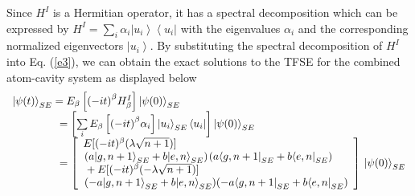\documentclass[
showpacs,  %
showkeys,  %
aps,       %
amsthm,    %
amsmath,   %
amsfonts,  %
amssymb    %
]{revtex4-1}          %
\begin{document}
Since ${H^I}$ is a Hermitian operator, it has a spectral decomposition which can be expressed by ${H^I} = \sum\limits_i {{\alpha _i}} \left| {{u_i}} \right\rangle \left\langle {{u_i}} \right|$ with the eigenvalues ${{\alpha _i}}$ and the corresponding normalized eigenvectors $\left| {{u_i}} \right\rangle$. By substituting the spectral decomposition of ${H^I}$ into Eq. (\ref{e3}), we can obtain the exact solutions to the TFSE for the combined atom-cavity system as displayed below
\begin{eqnarray}
\label{e12}
\begin{array}{l}
{\left| {\psi (t)} \right\rangle _{SE}} = {E_\beta }\left[ {{{( - it)}^\beta }H_\beta ^I} \right]{\left| {\psi (0)} \right\rangle _{SE}}\\
{\kern 1pt} {\kern 1pt} {\kern 1pt} {\kern 1pt} {\kern 1pt} {\kern 1pt} {\kern 1pt} {\kern 1pt} {\kern 1pt} {\kern 1pt} {\kern 1pt} {\kern 1pt} {\kern 1pt} {\kern 1pt} {\kern 1pt} {\kern 1pt} {\kern 1pt} {\kern 1pt} {\kern 1pt} {\kern 1pt} {\kern 1pt} {\kern 1pt} {\kern 1pt} {\kern 1pt} {\kern 1pt} {\kern 1pt} {\kern 1pt} {\kern 1pt} {\kern 1pt} {\kern 1pt} {\kern 1pt} {\kern 1pt} {\kern 1pt} {\kern 1pt} {\kern 1pt} {\kern 1pt} {\kern 1pt} {\kern 1pt} {\kern 1pt} {\kern 1pt} {\kern 1pt}  = \left[ {\sum\limits_i {{E_\beta }\left[ {{{( - it)}^\beta }{\alpha _i}} \right]{{\left| {{u_i}} \right\rangle }_{SE}}\left\langle {{u_i}} \right|} } \right]{\left| {\psi (0)} \right\rangle _{SE}}\\
{\kern 1pt} {\kern 1pt} {\kern 1pt} {\kern 1pt} {\kern 1pt} {\kern 1pt} {\kern 1pt} {\kern 1pt} {\kern 1pt} {\kern 1pt} {\kern 1pt} {\kern 1pt} {\kern 1pt} {\kern 1pt} {\kern 1pt} {\kern 1pt} {\kern 1pt} {\kern 1pt} {\kern 1pt} {\kern 1pt} {\kern 1pt} {\kern 1pt} {\kern 1pt} {\kern 1pt} {\kern 1pt} {\kern 1pt} {\kern 1pt} {\kern 1pt} {\kern 1pt} {\kern 1pt} {\kern 1pt} {\kern 1pt} {\kern 1pt} {\kern 1pt} {\kern 1pt} {\kern 1pt} {\kern 1pt} {\kern 1pt} {\kern 1pt} {\kern 1pt} {\kern 1pt}  = \left[ \begin{array}{l}
E[{( - it)^\beta }(\lambda \sqrt {n + 1} )]{\kern 1pt} \\
{\kern 1pt} (a{\left| {g,n + 1} \right\rangle _{SE}} + b{\left| {e,n} \right\rangle _{SE}}){\kern 1pt} (a{\left\langle {g,n + 1} \right|_{SE}} + b{\left\langle {e,n} \right|_{SE}}){\kern 1pt} \\
{\kern 1pt}  + E[{( - it)^\beta }( - \lambda \sqrt {n + 1} )]\\
{\kern 1pt} ( - a{\left| {g,n + 1} \right\rangle _{SE}} + b{\left| {e,n} \right\rangle _{SE}})(-a{\left\langle {g,n + 1} \right|_{SE}} + b{\left\langle {e,n} \right|_{SE}})
\end{array} \right]\,{\left| {\psi (0)} \right\rangle _{SE}}
\end{array}
\end{eqnarray}
\end{document}

